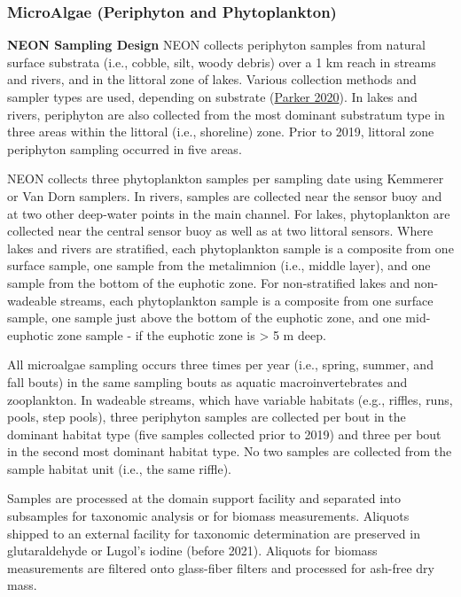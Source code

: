 \documentclass[
  12pt,
]{article}
\begin{document}
\hypertarget{microalgae-periphyton-and-phytoplankton}{%
\subsubsection{MicroAlgae (Periphyton and Phytoplankton)}\label{microalgae-periphyton-and-phytoplankton}}

\textbf{NEON Sampling Design} NEON collects periphyton samples from natural surface substrata (i.e., cobble, silt, woody debris) over a 1 km reach in streams and rivers, and in the littoral zone of lakes. Various collection methods and sampler types are used, depending on substrate (\protect\hyperlink{ref-Parker2020}{Parker 2020}). In lakes and rivers, periphyton are also collected from the most dominant substratum type in three areas within the littoral (i.e., shoreline) zone. Prior to 2019, littoral zone periphyton sampling occurred in five areas.

NEON collects three phytoplankton samples per sampling date using Kemmerer or Van Dorn samplers. In rivers, samples are collected near the sensor buoy and at two other deep-water points in the main channel. For lakes, phytoplankton are collected near the central sensor buoy as well as at two littoral sensors. Where lakes and rivers are stratified, each phytoplankton sample is a composite from one surface sample, one sample from the metalimnion (i.e., middle layer), and one sample from the bottom of the euphotic zone. For non-stratified lakes and non-wadeable streams, each phytoplankton sample is a composite from one surface sample, one sample just above the bottom of the euphotic zone, and one mid-euphotic zone sample - if the euphotic zone is \textgreater{} 5 m deep.

All microalgae sampling occurs three times per year (i.e., spring, summer, and fall bouts) in the same sampling bouts as aquatic macroinvertebrates and zooplankton. In wadeable streams, which have variable habitats (e.g., riffles, runs, pools, step pools), three periphyton samples are collected per bout in the dominant habitat type (five samples collected prior to 2019) and three per bout in the second most dominant habitat type. No two samples are collected from the sample habitat unit (i.e., the same riffle).

Samples are processed at the domain support facility and separated into subsamples for taxonomic analysis or for biomass measurements. Aliquots shipped to an external facility for taxonomic determination are preserved in glutaraldehyde or Lugol's iodine (before 2021). Aliquots for biomass measurements are filtered onto glass-fiber filters and processed for ash-free dry mass.
\end{document}
